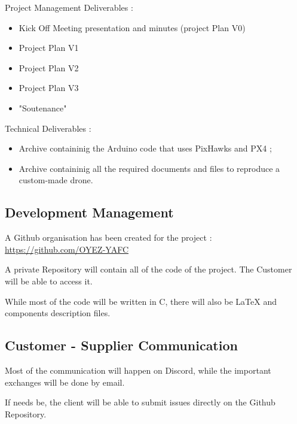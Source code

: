 \documentclass{beamer}
\begin{document}
\begin{frame}
    \begin{minipage}{0.48\textwidth}
        Project Management Deliverables :
        \begin{itemize}
            \item Kick Off Meeting presentation and minutes (project Plan V0)
            \item Project Plan V1
            \item Project Plan V2
            \item Project Plan V3
            \item "Soutenance"
        \end{itemize}
    \end{minipage}
    \hfill
    \begin{minipage}{0.48\textwidth}
        Technical Deliverables :
        \begin{itemize}
            \item Archive containinig the Arduino code that uses PixHawks and PX4 ;
            \item Archive containinig all the required documents and files to reproduce a custom-made drone.
        \end{itemize}
    \end{minipage}
\end{frame}


\subsection{Development Management}
\begin{frame}
    A Github organisation has been created for the project : \href{https://github.com/OYEZ-YAFC}{https://github.com/OYEZ-YAFC}

    \vspace*{10mm}

    A private Repository will contain all of the code of the project. The Customer will be able to access it.

    \vspace*{10mm}

    While most of the code will be written in C, there will also be LaTeX and components description files.
\end{frame}



\subsection{Customer - Supplier Communication}
\begin{frame}
    Most of the communication will happen on Discord, while the important exchanges will be done by email.

    \vspace*{5mm}

    If needs be, the client will be able to submit issues directly on the Github Repository.
\end{frame}
\end{document}
